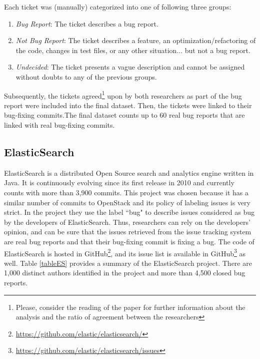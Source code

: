 \documentclass[a4paper, 12pt]{book}
\begin{document}
Each ticket was (manually) categorized into one of following three groups:
\begin{enumerate}
  \item \textit{Bug Report}: The ticket describes a bug report.
  \item \textit{Not Bug Report}: The ticket describes a feature, an optimization/refactoring of the code, changes in test files, or any other situation... but not a bug report.
  \item \textit{Undecided}: The ticket presents a vague description and cannot be assigned without doubts to any of the previous groups.
\end{enumerate}

Subsequently, the tickets agreed\footnote{Please, consider the reading of the paper for further information about the analysis and the ratio of agreement between the researchers}  upon by both researchers as part of the bug report were included into the final dataset. Then, the tickets were linked to their bug-fixing commits.The final dataset counts up to 60 real bug reports that are linked with real bug-fixing commits.

\subsection{ElasticSearch}
ElasticSearch is a distributed Open Source search and analytics engine written in Java. It is continuously evolving since its first release in 2010 and currently counts with more than 3,900 commits. This project was  chosen because it has a similar number of commits to OpenStack and its policy of labeling issues is very strict. In the project they use the label ``bug" to describe issues considered as bug by the developers of ElasticSearch. Thus, researchers can rely on the developers' opinion, and can be sure that the issues retrieved from the issue tracking system are real bug reports and that their bug-fixing commit is fixing a bug. The code of ElasticSearch is hosted in GitHub\footnote{\url{https://github.com/elastic/elasticsearch/}}, and its issue list is available in GitHub\footnote{\url{https://github.com/elastic/elasticsearch/issues}} as well. Table \ref{tableES} provides a summary of the ElasticSearch project. There are 1,000 distinct authors identified in the project and more than 4,500 closed bug reports. 
\end{document}
